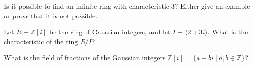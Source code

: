 \documentclass[12pt,letterpaper,boxed]{hmcpset}
\begin{document}
\begin{solution}
\end{solution}

\clearpage

\begin{problem}[16.3.2]
Is it possible to find an infinite ring with characteristic 3? Either give an example or prove that it is not possible.
\end{problem}

\begin{solution}
\end{solution}

\clearpage

\begin{problem}[16.3.7]
Let $R = \mathbb{Z}[i]$ be the ring of Gaussian integers, and let $I = \langle 2 + 3i \rangle$. What is the characteristic of the ring $R/I$?
\end{problem}

\begin{solution}
\end{solution}

\clearpage

\begin{problem}[17.1.1]
What is the field of fractions of the Gaussian integers $\mathbb{Z}[i] = \{ a + bi \ \vert \ a,b \in \mathbb{Z} \}$?
\end{problem}

\begin{solution}

\end{solution}
\end{document}
